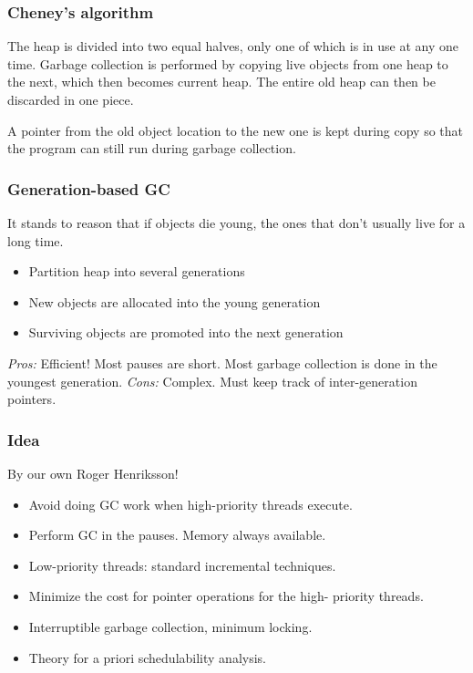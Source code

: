 \documentclass[a4paper]{article}
\begin{document}
\subsubsection{Cheney's algorithm}
The heap is divided into two equal halves, only one of which is in use at any
one time. Garbage collection is performed by copying live objects from one heap
to the next, which then becomes current heap. The entire old heap can then be
discarded in one piece.

A pointer from the old object location to the new one is kept during copy so
that the program can still run during garbage collection.

\subsubsection{Generation-based GC}
It stands to reason that if objects die young, the ones that don't usually
live for a long time.

\begin{itemize}
  \item Partition heap into several generations
  \item New objects are allocated into the young generation
  \item Surviving objects are promoted into the next generation
\end{itemize}

\emph{Pros:} Efficient! Most pauses are short. Most garbage collection is done
             in the youngest generation.
\emph{Cons:} Complex. Must keep track of inter-generation pointers.

\subsubsection{Idea}
By our own Roger Henriksson!
\begin{itemize}
  \item Avoid doing GC work when high-priority threads execute.
  \item Perform GC in the pauses. Memory always available.
  \item Low-priority threads: standard incremental techniques.
  \item Minimize the cost for pointer operations for the high-
        priority threads.
  \item Interruptible garbage collection, minimum locking.
  \item Theory for a priori schedulability analysis.
\end{itemize}
\end{document}
